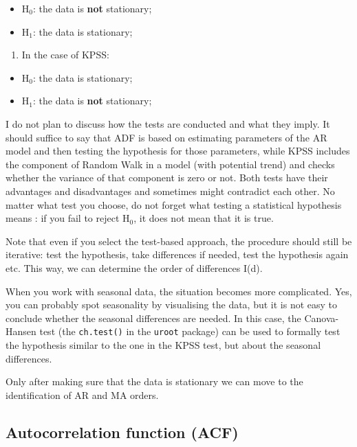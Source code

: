 \documentclass[
]{book}
\providecommand{\tightlist}{%
  \setlength{\itemsep}{0pt}\setlength{\parskip}{0pt}}
\theoremstyle{definition}
\theoremstyle{definition}
\theoremstyle{definition}
\theoremstyle{definition}
\theoremstyle{remark}
\begin{document}
\begin{itemize}
\tightlist
\item
  H\(_0\): the data is \textbf{not} stationary;
\item
  H\(_1\): the data is stationary;
\end{itemize}

\begin{enumerate}
\def\labelenumi{\arabic{enumi}.}
\setcounter{enumi}{1}
\tightlist
\item
  In the case of KPSS:
\end{enumerate}

\begin{itemize}
\tightlist
\item
  H\(_0\): the data is stationary;
\item
  H\(_1\): the data is \textbf{not} stationary;
\end{itemize}

I do not plan to discuss how the tests are conducted and what they imply. It should suffice to say that ADF is based on estimating parameters of the AR model and then testing the hypothesis for those parameters, while KPSS includes the component of Random Walk in a model (with potential trend) and checks whether the variance of that component is zero or not. Both tests have their advantages and disadvantages and sometimes might contradict each other. No matter what test you choose, do not forget what testing a statistical hypothesis means \citep[see Section 5.3 of][]{SvetunkovSBA}: if you fail to reject H\(_0\), it does not mean that it is true.

Note that even if you select the test-based approach, the procedure should still be iterative: test the hypothesis, take differences if needed, test the hypothesis again etc. This way, we can determine the order of differences I(d).

When you work with seasonal data, the situation becomes more complicated. Yes, you can probably spot seasonality by visualising the data, but it is not easy to conclude whether the seasonal differences are needed. In this case, the Canova-Hansen test (the \texttt{ch.test()} in the \texttt{uroot} package) can be used to formally test the hypothesis similar to the one in the KPSS test, but about the seasonal differences.

Only after making sure that the data is stationary we can move to the identification of AR and MA orders.

\hypertarget{ACF}{%
\subsection{Autocorrelation function (ACF)}\label{ACF}}
\end{document}
